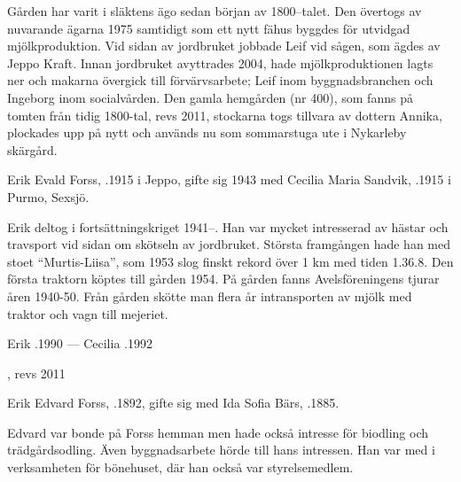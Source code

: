 Gården har varit i släktens ägo sedan början av 1800--talet. Den övertogs av nuvarande ägarna 1975 samtidigt som ett nytt fähus byggdes för utvidgad mjölkproduktion. Vid sidan av jordbruket jobbade Leif vid sågen, som ägdes av Jeppo Kraft. Innan jordbruket avyttrades 2004, hade mjölkproduktionen lagts ner och makarna övergick till förvärvsarbete; Leif inom byggnadsbranchen och Ingeborg inom socialvården. Den gamla hemgården (nr 400), som fanns på tomten från tidig 1800-tal, revs 2011, stockarna togs tillvara av dottern Annika, plockades upp på nytt och används nu som sommarstuga ute i Nykarleby skärgård.


%
Erik Evald Forss, .1915 i Jeppo, gifte sig 1943 med Cecilia Maria Sandvik, .1915 i Purmo, Sexsjö.
\begin{jhchildren}
  \item {}
  \item {}
  \item {}
  \item {}
\end{jhchildren}

Erik deltog i fortsättningskriget 1941--. Han var mycket intresserad av hästar och travsport vid sidan om skötseln av jordbruket. Största framgången hade han med  stoet ``Murtis-Liisa'', som 1953 slog finskt rekord över 1 km med tiden 1.36.8. Den första traktorn köptes till gården 1954. På gården fanns Avelsföreningens tjurar åren 1940-50. Från gården skötte man flera år intransporten av mjölk med traktor och vagn till mejeriet.

Erik .1990  ---  Cecilia .1992


%
, revs 2011



%
Erik Edvard Forss, .1892, gifte sig med Ida Sofia Bärs, .1885.
\begin{jhchildren}
  \item {}
  \item {}
  \item {}
\end{jhchildren}
Edvard var bonde på Forss hemman men hade också intresse för biodling och trädgårdsodling. Även byggnadsarbete hörde till hans intressen. Han var med i verksamheten för bönehuset, där han också var styrelsemedlem.

